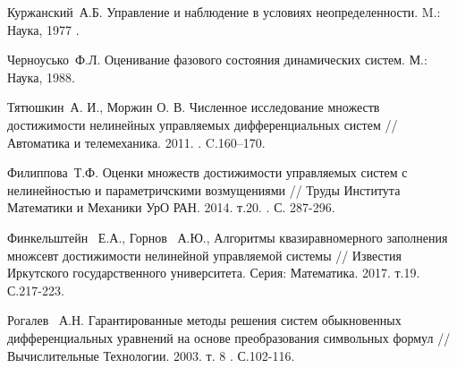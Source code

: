 \begin{thebibliography}{9} %




 Куржанский~А.Б. Управление и наблюдение в условиях неопределенности. M.:~ Наука, 1977 .

Черноусько~Ф.Л. Оценивание фазового состояния динамических систем. М.:~ Наука, 1988.

 Тятюшкин~А. И.,  Моржин О. В.  Численное исследование множеств достижимости нелинейных управляемых дифференциальных систем // Автоматика и телемеханика. 2011. . C.160--170.

Филиппова~Т.Ф. Оценки множеств достижимости управляемых систем с нелинейностью и параметричскими возмущениями // Труды Института Математики и Механики УрО РАН. 2014. т.20. . С. 287-296.

 Финкельштейн~ Е.А., Горнов~ А.Ю., Алгоритмы квазиравномерного заполнения множсевт достижимости нелинейной управляемой системы // Известия Иркутского государственного университета. Серия: Математика. 2017. т.19. С.217-223.

 Рогалев~ А.Н. Гарантированные методы решения систем обыкновенных дифференциальных уравнений на основе преобразования символьных формул // Вычислительные Технологии. 2003. т. 8 . С.102-116.



\end{thebibliography}
